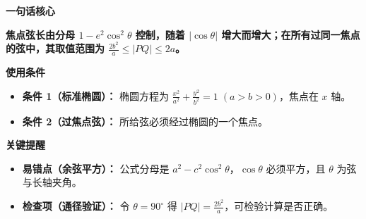 \begin{summarybox}

	\textbf{\textcolor{CSummary}{一句话核心}}

	\textbf{焦点弦长由分母 $1-e^2\cos^2\theta$ 控制，随着 $|\cos\theta|$ 增大而增大；在所有过同一焦点的弦中，其取值范围为 $\frac{2b^2}{a}\le |PQ|\le 2a$。}

	\medskip

	\textbf{\textcolor{CSummary}{使用条件}}
	\begin{itemize}[leftmargin=*, itemsep=0.5em, topsep=0.4em]
		\item \textbf{条件 1（标准椭圆）：} 椭圆方程为 $\frac{x^2}{a^2}+\frac{y^2}{b^2}=1\;(a>b>0)$，焦点在 $x$ 轴。
		\item \textbf{条件 2（过焦点弦）：} 所给弦必须经过椭圆的一个焦点。
	\end{itemize}

	\medskip

	\textbf{\textcolor{CSummary}{关键提醒}}
	\begin{itemize}[leftmargin=*, itemsep=0.5em, topsep=0.4em]
		\item \textbf{易错点（余弦平方）：} 公式分母是 $a^2-c^2\cos^2\theta$，$\cos\theta$ 必须平方，且 $\theta$ 为弦与长轴夹角。
		\item \textbf{检查项（通径验证）：} 令 $\theta=90^\circ$ 得 $|PQ|=\frac{2b^2}{a}$，可检验计算是否正确。
	\end{itemize}

\end{summarybox}